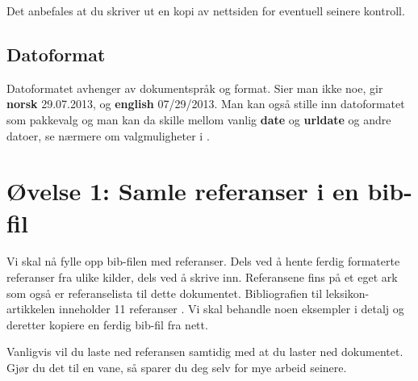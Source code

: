\documentclass[11pt,norsk,a4paper]{article}
\newcommand{\blt}{B{\smaller[2]IB}\discretionary{-}{}{\kern
    -0.12em}\LaTeX{}}
\begin{document}
Det anbefales at du skriver ut en kopi av nettsiden for eventuell
seinere kontroll. 





\subsection{Datoformat}
Datoformatet avhenger av dokumentspråk og format. Sier man ikke noe, gir
\textbf{norsk} 29.07.2013, og \textbf{english}  07/29/2013. Man kan
også stille inn datoformatet som pakkevalg og man kan da skille mellom
vanlig \textbf{date} og \textbf{urldate} og andre datoer, se nærmere
om valgmuligheter i \cite[][50--53]{biblatex}.

\section{Øvelse 1: Samle referanser i en bib-fil} Vi skal nå fylle opp
bib-filen med referanser. Dels ved å hente ferdig formaterte
referanser fra ulike kilder, dels ved å skrive inn. Referansene fins
på et eget ark som også er referanselista til dette dokumentet.
Bibliografien til leksikon-artikkelen inneholder 11 referanser
\cite{hutchins1986,olsen1992,johnson1989,shneiderman1983,hartson1989,jacob1986,myers1995,foley1990,foley1987,shneiderman1992,stephenson1999}. Vi
skal behandle noen eksempler i detalj og deretter kopiere en ferdig
bib-fil fra nett.

Vanligvis vil du laste ned referansen samtidig med at du laster ned
dokumentet. Gjør du det til en vane, så sparer du deg selv for mye
arbeid seinere.
\end{document}

